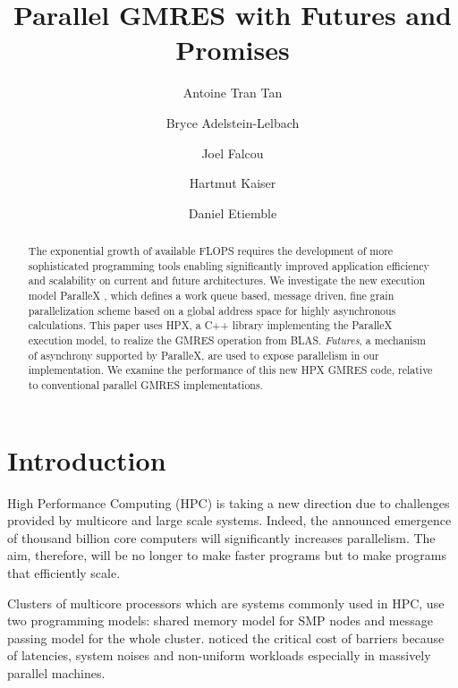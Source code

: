 \documentclass{llncs}
\begin{document}
\title{Parallel GMRES with Futures and Promises}

\author{Antoine Tran Tan \and Bryce Adelstein-Lelbach \and Joel Falcou \and Hartmut Kaiser \and
Daniel Etiemble }

\maketitle

\begin{abstract}
The exponential growth of available FLOPS requires the development of 
more sophisticated programming tools enabling significantly improved 
application efficiency and scalability on current and future architectures. 
We investigate the new execution model ParalleX \cite{ParalleX}, 
which defines a work queue based, message driven, fine grain parallelization 
scheme based on a global address space for highly asynchronous calculations. 
This paper uses HPX\cite{hpx}, a C++ library implementing the 
ParalleX execution model, to realize the GMRES operation from
BLAS\cite{GMRES}. \emph{Futures}\cite{futures}, a mechanism of asynchrony supported by
ParalleX, are used to expose parallelism in our implementation. We examine
the performance of this new HPX GMRES code, relative to conventional parallel
GMRES implementations. 
\end{abstract}


\section{Introduction}\label{Introduction}
High Performance Computing (HPC) is taking a new direction due to challenges
provided by multicore and large scale systems. Indeed, the announced emergence
of thousand billion core computers will significantly increases parallelism.
The aim, therefore, will be no longer to make faster programs but to make
programs that efficiently scale.\smallskip 

Clusters of multicore processors which are systems commonly used in HPC, use
two programming models: shared memory model for SMP nodes and message passing
model for the whole cluster.  noticed the critical cost of barriers because
of latencies, system noises and non-uniform workloads especially in massively
parallel machines.\smallskip 
\end{document}
